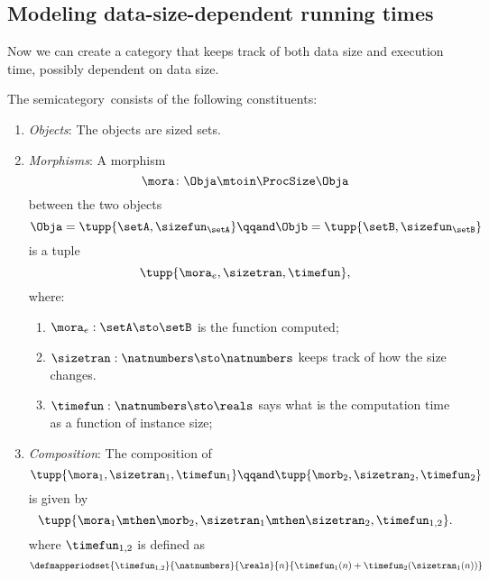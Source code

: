 \subsection{Modeling data-size-dependent running times}

Now we can create a category that keeps track of both data size and execution time, possibly dependent on data size.
\begin{definition}
	\label{def:ProcSizeTime}
	The semicategory~\ProcSizeTime consists of the following constituents:
	\begin{enumerate}
		\item \emph{Objects}: The objects are sized sets.
		\item \emph{Morphisms}: A morphism
		      \begin{equation}
			      \mora \colon \Obja \mtoin\ProcSize \Obja
		      \end{equation}
		      between the two objects
		      \begin{equation}
			      \Obja = \tupp{\setA, \sizefun_{\setA}}
			      \qqand
			      \Objb = \tupp{\setB, \sizefun_{\setB}}
		      \end{equation}
		      is a tuple
		      \begin{equation}
			      \tupp{\mora_e, \sizetran, \timefun },
		      \end{equation}
		      where:
		      \begin{enumerate}
			      \item $\mora_e : \setA \sto \setB$ is the function computed;
			      \item $\sizetran: \natnumbers \sto \natnumbers$ keeps track of how the size changes.
			      \item $\timefun: \natnumbers \sto \reals$ says what is the computation time as a function of instance size;
		      \end{enumerate}

		\item \emph{Composition}: The composition of
		      \begin{equation}
			      \tupp{\mora_1, \sizetran_1,  \timefun_1  }
			      \qqand
			      \tupp{\morb_2, \sizetran_2,  \timefun_2  }
		      \end{equation}
		      is given by
		      \begin{equation}
			      \tupp{
				      \mora_1 \mthen \morb_2,
				      \sizetran_1 \mthen \sizetran_2,
				      \timefun_{1,2}
			      }.
		      \end{equation}
		      where $\timefun_{1,2}$ is defined as
		      \begin{equation}
			      \label{eq:timefun-composition}
			      \defmapperiodset{
				      \timefun_{1,2}
			      }{
				      \natnumbers
			      }{
				      \reals
			      }{
				      n
			      }{
				      \timefun_1(n) + \timefun_2(\sizetran_1(n))
			      }
		      \end{equation}
	\end{enumerate}
\end{definition}

